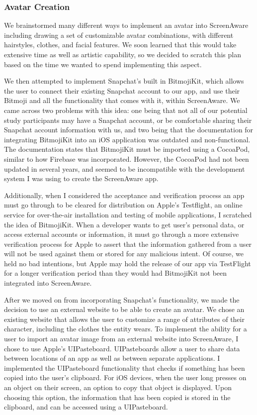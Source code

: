 \documentclass[12pt, title page, manuscript, nonacm]{acmart}
\begin{document}
\subsubsection*{Avatar Creation}
We brainstormed many different ways to implement an avatar into ScreenAware including drawing a set of customizable avatar combinations, with different hairstyles, clothes, and facial features. We soon learned that this would take extensive time as well as artistic capability, so we decided to scratch this plan based on the time we wanted to spend implementing this aspect.
\par We then attempted to implement Snapchat's built in BitmojiKit\cite{snapchat}, which allows the user to connect their existing Snapchat account to our app, and use their Bitmoji and all the functionality that comes with it, within ScreenAware. We came across two problems with this idea: one being that not all of our potential study participants may have a Snapchat account, or be comfortable sharing their Snapchat account information with us, and two being that the documentation for integrating BitmojiKit into an iOS application was outdated and non-functional. The documentation states that BitmojiKit must be imported using a CocoaPod, similar to how Firebase was incorporated. However, the CocoaPod had not been updated in several years, and seemed to be incompatible with the development system I was using to create the ScreenAware app.
\par Additionally, when I considered the acceptance and verification process an app must go through to be cleared for distribution on Apple's Testflight, an online service for over-the-air installation and testing of mobile applications, I scratched the idea of BitmojiKit. When a developer wants to get user's personal data, or access external accounts or information, it must go through a more extensive verification process for Apple to assert that the information gathered from a user will not be used against them or stored for any malicious intent. Of course, we held no bad intentions, but Apple may hold the release of our app via TestFlight for a longer verification period than they would had BitmojiKit not been integrated into ScreenAware.
\par After we moved on from incorporating Snapchat's functionality, we made the decision to use an external website to be able to create an avatar\cite{avatar}. We chose an existing website that allows the user to customize a range of attributes of their character, including the clothes the entity wears. To implement the ability for a user to import an avatar image from an external website into ScreenAware, I chose to use Apple's UIPasteboard. UIPasteboards allow a user to share data between locations of an app as well as between separate applications. I implemented the UIPasteboard functionality that checks if something has been copied into the user's clipboard. For iOS devices, when the user long presses on an object on their screen, an option to copy that object is displayed. Upon choosing this option, the information that has been copied is stored in the clipboard, and can be accessed using a UIPasteboard.
\end{document}
